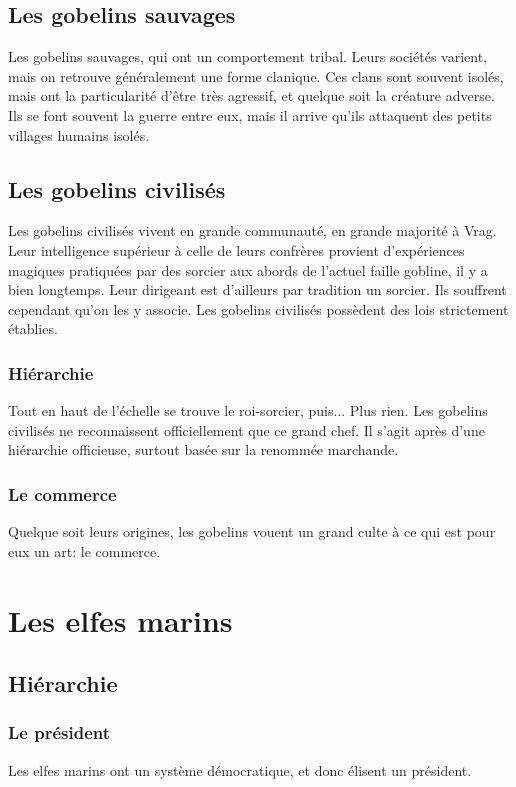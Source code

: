 \subsection{Les gobelins sauvages}
Les gobelins sauvages, qui ont un comportement tribal. Leurs sociétés varient, mais on retrouve généralement une forme clanique. Ces clans sont souvent isolés, mais ont la particularité d'être très agressif, et quelque soit la créature adverse. Ils se font souvent la guerre entre eux, mais il arrive qu'ils attaquent des petits villages humains isolés.
\subsection{Les gobelins civilisés}
Les gobelins civilisés vivent en grande communauté, en grande majorité à Vrag. Leur intelligence supérieur à celle de leurs confrères provient d'expériences magiques pratiquées par des sorcier aux abords de l'actuel faille gobline, il y a bien longtemps. Leur dirigeant est d'ailleurs par tradition un sorcier.
Ils souffrent cependant qu’on les y associe. Les gobelins civilisés possèdent des lois strictement établies.
\subsubsection{Hiérarchie}
Tout en haut de l'échelle se trouve le roi-sorcier, puis... Plus rien. Les gobelins civilisés ne reconnaissent officiellement que ce grand chef. Il s'agit après d'une hiérarchie officieuse, surtout basée sur la renommée marchande.
\subsubsection{Le commerce}
Quelque soit leurs origines, les gobelins vouent un grand culte à ce qui est pour eux un art: le commerce.

\section{Les elfes marins}
\subsection{Hiérarchie}
\subsubsection{Le président}
Les elfes marins ont un système démocratique, et donc élisent un président.